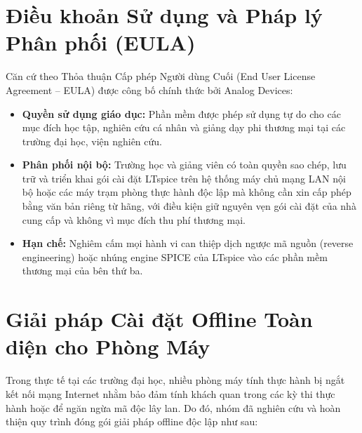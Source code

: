 \documentclass[12pt,a4paper]{report}
\begin{document}
\section{Điều khoản Sử dụng và Pháp lý Phân phối (EULA)}
Căn cứ theo Thỏa thuận Cấp phép Người dùng Cuối (End User License Agreement -- EULA) được công bố chính thức bởi Analog Devices:
\begin{itemize}
    \item \textbf{Quyền sử dụng giáo dục:} Phần mềm được phép sử dụng tự do cho các mục đích học tập, nghiên cứu cá nhân và giảng dạy phi thương mại tại các trường đại học, viện nghiên cứu.
    \item \textbf{Phân phối nội bộ:} Trường học và giảng viên có toàn quyền sao chép, lưu trữ và triển khai gói cài đặt LTspice trên hệ thống máy chủ mạng LAN nội bộ hoặc các máy trạm phòng thực hành độc lập mà không cần xin cấp phép bằng văn bản riêng từ hãng, với điều kiện giữ nguyên vẹn gói cài đặt của nhà cung cấp và không vì mục đích thu phí thương mại.
    \item \textbf{Hạn chế:} Nghiêm cấm mọi hành vi can thiệp dịch ngược mã nguồn (reverse engineering) hoặc nhúng engine SPICE của LTspice vào các phần mềm thương mại của bên thứ ba.
\end{itemize}

\section{Giải pháp Cài đặt Offline Toàn diện cho Phòng Máy}
Trong thực tế tại các trường đại học, nhiều phòng máy tính thực hành bị ngắt kết nối mạng Internet nhằm bảo đảm tính khách quan trong các kỳ thi thực hành hoặc để ngăn ngừa mã độc lây lan. Do đó, nhóm đã nghiên cứu và hoàn thiện quy trình đóng gói giải pháp offline độc lập như sau:
\end{document}
